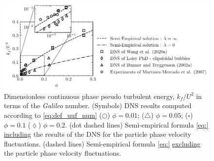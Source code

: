\begin{figure}
    \centering
    \includegraphics[height = 0.35\textwidth]{image/HOMOGENEOUS_final/CA/KFliterature.pdf}
    \caption{Dimensionless continuous phase pseudo turbulent energy, $k_f/U^2$ in terms of the \textit{Galileo} number.
    (Symbols) DNS results computed according to \ref{eq:def_uuf_num}
    ($\pmb\bigcirc$) $\phi = 0.01$; ($\pmb\triangle$) $ \phi = 0.05$; ($\pmb\square$) $\phi = 0.1$ ($\pmb\lozenge$) $\phi = 0.2$.
    (dot dashed lines) Semi-empirical formula \ref{eq:} \underline{including} the results of the DNS for the particle phase velocity fluctuations. 
    (dashed lines) Semi-empirical formula \ref{eq:} \underline{excluding} the particle phase velocity fluctuations. 
    }
    \label{fig:kf}
\end{figure}
